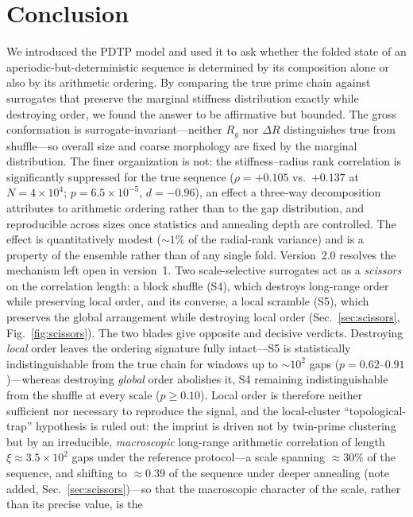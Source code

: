\documentclass[11pt]{article}
\begin{document}
\section{Conclusion}
We introduced the PDTP model and used it to ask whether the folded state of an
aperiodic-but-deterministic sequence is determined by its composition alone or also by
its arithmetic ordering. By comparing the true prime chain against surrogates that
preserve the marginal stiffness distribution exactly while destroying order, we found
the answer to be affirmative but bounded. The gross conformation is
surrogate-invariant---neither $R_g$ nor $\Delta R$ distinguishes true from shuffle---so
overall size and coarse morphology are fixed by the marginal distribution. The finer
organization is not: the stiffness--radius rank correlation is significantly suppressed
for the true sequence ($\rho = +0.105$ vs.\ $+0.137$ at $N = 4\times10^4$;
$p = 6.5\times10^{-5}$, $d = -0.96$), an effect a three-way decomposition attributes to
arithmetic ordering rather than to the gap distribution, and reproducible across sizes
once statistics and annealing depth are controlled. The effect is quantitatively
modest ($\sim\!1\%$ of the radial-rank variance) and is a property of the ensemble
rather than of any single fold. Version~2.0 resolves the mechanism left open in version~1. Two scale-selective
surrogates act as a \emph{scissors} on the correlation length: a block shuffle (S4),
which destroys long-range order while preserving local order, and its converse, a
local scramble (S5), which preserves the global arrangement while destroying local
order (Sec.~\ref{sec:scissors}, Fig.~\ref{fig:scissors}). The two blades give opposite
and decisive verdicts. Destroying \emph{local} order leaves the ordering signature
fully intact---S5 is statistically indistinguishable from the true chain for windows
up to ${\sim}10^{2}$ gaps ($p = 0.62$--$0.91$)---whereas destroying \emph{global}
order abolishes it, S4 remaining indistinguishable from the shuffle at every scale
($p \ge 0.10$). Local order is therefore neither sufficient nor necessary to
reproduce the signal, and the local-cluster ``topological-trap'' hypothesis is ruled
out: the imprint is driven not by twin-prime clustering but by an irreducible,
\emph{macroscopic} long-range arithmetic correlation of length
$\xi \approx 3.5\times10^{2}$ gaps under the reference protocol---a scale spanning
${\approx}30\%$ of the sequence, and shifting to ${\approx}0.39$ of the sequence
under deeper annealing (note added, Sec.~\ref{sec:scissors})---so that the
macroscopic character of the scale, rather than its precise value, is the
\end{document}
